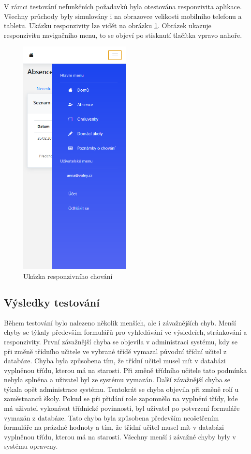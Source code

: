 \subsubsection*{}
V rámci testování nefunkčních požadavků byla otestována responzivita aplikace. Všechny průchody byly simulovány i na obrazovce velikosti mobilního telefonu a tabletu. Ukázku responzivity lze vidět na obrázku \ref{app-responz}. Obrázek ukazuje responzivitu navigačního menu, to se objeví po stisknutí tlačítka vpravo nahoře.
\clearpage
\begin{figure}[h]
	\centering
	\includegraphics[width=0.5\textwidth]{images/aplikace_responzivni.png}
	\caption{Ukázka responzivního chování}
	\label{app-responz}
\end{figure}


\subsection{Výsledky testování}
Během testování bylo nalezeno několik menších, ale i závažnějších chyb. Menší chyby se týkaly především formulářů pro vyhledávání ve výsledcích, stránkování a responzivity. První závažnější chyba se objevila v administraci systému, kdy se při změně třídního učitele ve vybrané třídě vymazal původní třídní učitel z databáze. Chyba byla způsobena tím, že třídní učitel musel mít v databázi vyplněnou třídu, kterou má na starosti. Při změně třídního učitele tato podmínka nebyla splněna a uživatel byl ze systému vymazán. Další závažnější chyba se týkala opět administrace systému. Tentokrát se chyba objevila při změně rolí u zaměstnanců školy. Pokud se při přidání role  zapomnělo na vyplnění třídy, kde má uživatel vykonávat třídnické povinnosti, byl uživatel po potvrzení formuláře vymazán z databáze. Tato chyba byla způsobena především neošetřením formuláře na prázdné hodnoty a tím, že třídní učitel musel mít v databázi vyplněnou třídu, kterou má na starosti. Všechny menší i závažné chyby byly v systému opraveny.